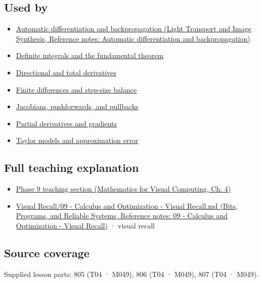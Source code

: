 \subsection{Used by}\label{appendix-7bc181935c42-used-by}

\hypertarget{appendix-7bc181935c42-used-by}{}

\begin{itemize}
\tightlist
\item
  \href{../04-Light-Transport-and-Image-Synthesis/main.pdf\#nameddest=appendix-40df0855b4a7}{Automatic differentiation and backpropagation (Light Transport and Image Synthesis, Reference notes: Automatic differentiation and backpropagation)}
\item
  \hyperref[appendix-1a50e72435c2]{Definite integrals and the fundamental theorem}
\item
  \hyperref[appendix-e2d476574aab]{Directional and total derivatives}
\item
  \hyperref[appendix-e2d7b4f2161d]{Finite differences and step-size balance}
\item
  \hyperref[appendix-d8a7ddb675eb]{Jacobians, pushforwards, and pullbacks}
\item
  \hyperref[appendix-677b59746ae0]{Partial derivatives and gradients}
\item
  \hyperref[appendix-32f39e9a3738]{Taylor models and approximation error}
\end{itemize}

\subsection{Full teaching explanation}\label{appendix-7bc181935c42-full-teaching-explanation}

\hypertarget{appendix-7bc181935c42-full-teaching-explanation}{}

\begin{itemize}
\tightlist
\item
  \href{../02-Mathematics-for-Visual-Computing/main.pdf\#nameddest=01-foundations-i-ch020-functions-limits-continuity-and-scalar-change}{Phase 9 teaching section (Mathematics for Visual Computing, Ch. 4)}
\item
  \href{../01-Bits-Programs-and-Reliable-Systems/main.pdf\#nameddest=appendix-adf48f5dc5c1}{Visual Recall/09 - Calculus and Optimization - Visual Recall.md (Bits, Programs, and Reliable Systems, Reference notes: 09 - Calculus and Optimization - Visual Recall)} · visual recall
\end{itemize}

\subsection{Source coverage}\label{appendix-7bc181935c42-source-coverage}

\hypertarget{appendix-7bc181935c42-source-coverage}{}

Supplied lesson parts: 805 (T04 · M049), 806 (T04 · M049), 807 (T04 · M049).
